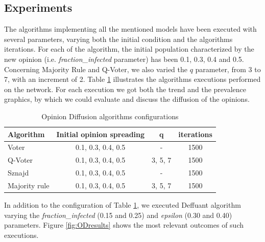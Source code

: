 \documentclass[sigchi]{acmart}
\begin{document}
\subsection{Experiments}
The algorithms implementing all the mentioned models have been executed with several parameters, varying both the initial condition and the algorithms iterations. 
For each of the algorithm, the initial population characterized by the new opinion (i.e. \textit{fraction\_infected} parameter) has been 0.1, 0.3, 0.4 and 0.5. Concerning Majority Rule and Q-Voter, we also varied the $q$ parameter, from 3 to 7, with an increment of 2.
Table \ref{tab:ODconfigs} illustrates the algorithms executions performed on the network. For each execution we got both the trend and the prevalence graphics, by which we could evaluate and discuss the diffusion of the opinions. 

\begin{table}
  \caption{Opinion Diffusion algorithms configurations}
  \label{tab:ODconfigs}
  \begin{tabular}{lccc}
    \toprule
    Algorithm & Initial opinion spreading & q & iterations\\
    \midrule
    Voter & 0.1, 0.3, 0.4, 0.5 & - & 1500\\
    Q-Voter & 0.1, 0.3, 0.4, 0.5 & 3, 5, 7 & 1500 \\
    Sznajd & 0.1, 0.3, 0.4, 0.5 & - & 1500\\
    Majority rule & 0.1, 0.3, 0.4, 0.5 & 3, 5, 7 & 1500\\
  \bottomrule
\end{tabular}
\end{table}

In addition to the configuration of Table \ref{tab:ODconfigs}, we executed Deffuant algorithm varying the \textit{fraction\_infected} (0.15 and 0.25) and \textit{epsilon} (0.30 and 0.40) parameters. Figure \ref{fig:ODresults} shows the most relevant outcomes of such executions. 
\end{document}
